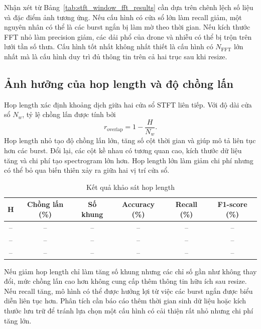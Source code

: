 \documentclass[../DoAn.tex]{subfiles}
\begin{document}
Nhận xét từ Bảng~\ref{tab:stft_window_fft_results} cần dựa trên chênh lệch số liệu và đặc điểm ảnh tương ứng. Nếu cấu hình có cửa sổ lớn làm recall giảm, một nguyên nhân có thể là các burst ngắn bị làm mờ theo thời gian. Nếu kích thước FFT nhỏ làm precision giảm, các dải phổ của drone và nhiễu có thể bị trộn trên lưới tần số thưa. Cấu hình tốt nhất không nhất thiết là cấu hình có $N_{\mathrm{FFT}}$ lớn nhất mà là cấu hình duy trì đủ thông tin trên cả hai trục sau khi resize.


\subsection{Ảnh hưởng của hop length và độ chồng lấn}

Hop length xác định khoảng dịch giữa hai cửa sổ STFT liên tiếp. Với độ dài cửa sổ $N_w$, tỷ lệ chồng lấn được tính bởi
\begin{equation}
    r_{\mathrm{overlap}}
    =
    1-\frac{H}{N_w}.
    \label{eq:stft_overlap}
\end{equation}
Hop length nhỏ tạo độ chồng lấn lớn, tăng số cột thời gian và giúp mô tả liên tục hơn các burst. Đổi lại, các cột kề nhau có tương quan cao, kích thước dữ liệu tăng và chi phí tạo spectrogram lớn hơn. Hop length lớn làm giảm chi phí nhưng có thể bỏ qua biến thiên xảy ra giữa hai vị trí cửa sổ.

\begin{table}[H]
    \centering
    \caption{Kết quả khảo sát hop length}
    \label{tab:stft_hop_results}
    \renewcommand{\arraystretch}{1.3}
    \begin{tabular}{|c|c|c|c|c|c|}
        \hline
        $\mathbf{H}$ & \textbf{Chồng lấn (\%)} & \textbf{Số khung} & \textbf{Accuracy (\%)} & \textbf{Recall (\%)} & \textbf{F1-score (\%)} \\ \hline
        -- & -- & -- & -- & -- & -- \\ \hline
        -- & -- & -- & -- & -- & -- \\ \hline
        -- & -- & -- & -- & -- & -- \\ \hline
    \end{tabular}
\end{table}

Nếu giảm hop length chỉ làm tăng số khung nhưng các chỉ số gần như không thay đổi, mức chồng lấn cao hơn không cung cấp thêm thông tin hữu ích sau resize. Nếu recall tăng, mô hình có thể được hưởng lợi từ việc các burst ngắn được biểu diễn liên tục hơn. Phân tích cần báo cáo thêm thời gian sinh dữ liệu hoặc kích thước lưu trữ để tránh lựa chọn một cấu hình có cải thiện rất nhỏ nhưng chi phí tăng lớn.
\end{document}
